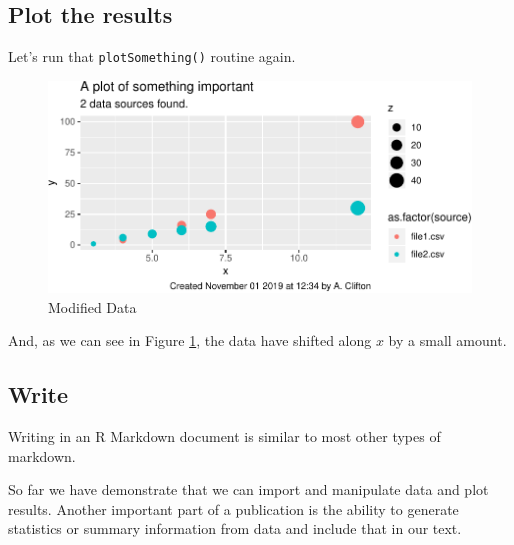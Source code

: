 \documentclass[11pt,]{article}
\newenvironment{Shaded}{\begin{snugshade}}{\end{snugshade}}
\newcommand{\FloatTok}[1]{\textcolor[rgb]{0.00,0.00,0.81}{#1}}
\newcommand{\NormalTok}[1]{#1}
\newcommand{\OperatorTok}[1]{\textcolor[rgb]{0.81,0.36,0.00}{\textbf{#1}}}
\newcommand{\StringTok}[1]{\textcolor[rgb]{0.31,0.60,0.02}{#1}}
\begin{document}
\begin{Shaded}
\end{Shaded}

\hypertarget{plot-the-results}{%
\subsection{Plot the results}\label{plot-the-results}}

Let's run that \texttt{plotSomething()} routine again.

\begin{figure}
\centering
\includegraphics{main_files/figure-latex/plot-modified-data-1.pdf}
\caption{\label{fig:plot-modified-data}Modified Data}
\end{figure}

And, as we can see in Figure \ref{fig:plot-modified-data}, the data have shifted along \(x\) by a small amount.

\hypertarget{implementWrite}{%
\subsection{Write}\label{implementWrite}}

Writing in an R Markdown document is similar to most other types of markdown.

So far we have demonstrate that we can import and manipulate data and plot results. Another important part of a publication is the ability to generate statistics or summary information from data and include that in our text.
\end{document}

